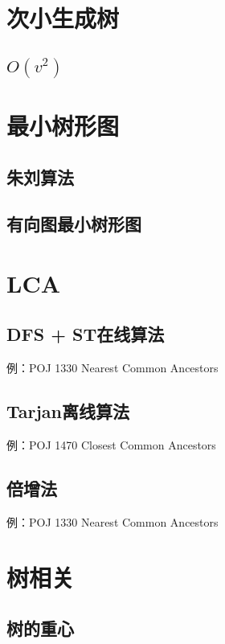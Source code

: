 \section{次小生成树}
\subsection{$O(v^2)$}



\section{最小树形图}
\subsection{朱刘算法}


\subsection{有向图最小树形图}




\section{LCA}
\subsection{DFS + ST在线算法}
例：POJ 1330 Nearest Common Ancestors


\subsection{Tarjan离线算法}
例：POJ 1470 Closest Common Ancestors


\subsection{倍增法}
例：POJ 1330 Nearest Common Ancestors



\section{树相关}
\subsection{树的重心}


